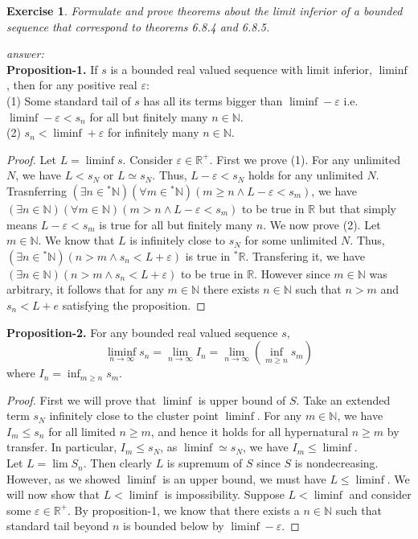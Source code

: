\documentclass[a4paper, 11pt]{book}
\theoremstyle{plain}
\newtheorem{exercise}{Exercise}[chapter]
\newenvironment{answer}
    {\textit{answer:}}
    {}
\theoremstyle{plain}
\newcommand{\arr}{\rightarrow}
\newcommand{\N}{\mathbb{N}}
\newcommand{\R}{\mathbb{R}}
\newcommand{\ep}{\varepsilon}
\newcommand{\hyp}{{}^*}
\begin{document}
  \begin{exercise}
    Formulate and prove theorems about the limit inferior of a bounded sequence that correspond to theorems 6.8.4 and 6.8.5.
  \end{exercise} 
  \begin{answer} $ $ \\
    \textbf{Proposition-1.} If $s$ is a bounded real valued sequence with limit inferior, $\liminf$, then for any positive real $\ep$: \\
    (1) Some standard tail of $s$ has all its terms bigger than $\liminf-\ep$ i.e. $\liminf-\ep<s_n$ for all but finitely many $n \in \N$. \\
    (2) $s_n<\liminf +\ep$ for infinitely many $n \in \N$.
    \begin{proof}
      Let $L=\liminf s$. Consider $\ep \in \R^+$. First we prove (1). For any unlimited $N$, we have $L<s_N$ or $L \simeq s_N$. Thus, $L-\ep<s_N$ holds for any unlimited $N$. Trasnferring $(\exists n \in \hyp \N)(\forall m \in \hyp \N)(m \geq n \land L-\ep<s_m)$, we have $(\exists n \in \N)(\forall m \in \N)(m>n \land L-\ep<s_m)$ to be true in $\R$ but that simply means $L-\ep<s_m$ is true for all but finitely many $n$. We now prove (2). Let $m \in \N$. We know that $L$ is infinitely close to $s_N$ for some unlimited $N$. Thus, $(\exists n \in \hyp \N)(n>m \land s_n<L+\ep)$ is true in $\hyp \R$. Transfering it, we have $(\exists n \in \N)(n>m \land s_n<L+\ep)$ to be true in $\R$. However since $m \in \N$ was arbitrary, it follows that for any $m \in \N$ there exists $n \in \N$ such that $n>m$ and $s_n<L+e$ satisfying the proposition.
    \end{proof}

    \textbf{Proposition-2.} For any bounded real valued sequence $s$, $$\liminf_{n \arr \infty} s_n=\lim_{n \arr \infty} I_n=\lim_{n \arr \infty} \left(\inf_{m \geq n} s_m \right)$$ where $I_n=\inf_{m \geq n} s_m$.
    \begin{proof}
      First we will prove that $\liminf$ is upper bound of $S$. Take an extended term $s_N$ infinitely close to the cluster point $\liminf$. For any $m \in \N$, we have $I_m \leq s_n$ for all limited $n \geq m$, and hence it holds for all hypernatural $n \geq m$ by transfer. In particular, $I_m \leq s_N$, as $\liminf \simeq s_N$, we have $I_m \leq \liminf$. \\
      Let $L=\lim S_n$. Then clearly $L$ is supremum of $S$ since $S$ is nondecreasing. However, as we showed $\liminf$ is an upper bound, we must have $L \leq \liminf$. We will now show that $L< \liminf$ is impossibility. Suppose $L< \liminf$ and consider some $\ep \in \R^+$. By proposition-1, we know that there exists a $n \in \N$ such that standard tail beyond $n$ is bounded below by $\liminf-\ep$.
    \end{proof}

  \end{answer}
  
\end{document}
